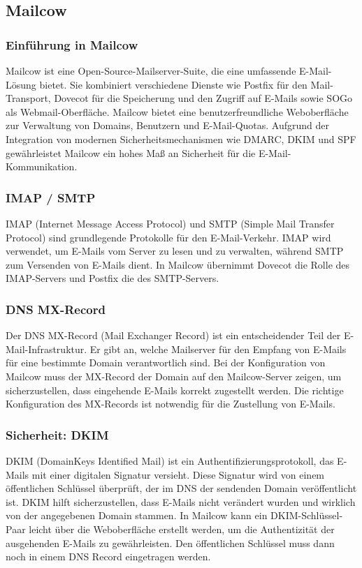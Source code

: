 \subsection{Mailcow}

\subsubsection{Einführung in Mailcow}
Mailcow ist eine Open-Source-Mailserver-Suite, die eine umfassende E-Mail-Lösung bietet. Sie kombiniert 
verschiedene Dienste wie Postfix für den Mail-Transport, Dovecot für die Speicherung und den Zugriff auf 
E-Mails sowie SOGo als Webmail-Oberfläche. Mailcow bietet eine benutzerfreundliche Weboberfläche zur 
Verwaltung von Domains, Benutzern und E-Mail-Quotas. Aufgrund der Integration von modernen Sicherheitsmechanismen 
wie DMARC, DKIM und SPF gewährleistet Mailcow ein hohes Maß an Sicherheit für die E-Mail-Kommunikation.

\subsubsection{IMAP / SMTP}
IMAP (Internet Message Access Protocol) und SMTP (Simple Mail Transfer Protocol) sind grundlegende Protokolle 
für den E-Mail-Verkehr. IMAP wird verwendet, um E-Mails vom Server zu lesen und zu verwalten, während SMTP zum 
Versenden von E-Mails dient. In Mailcow übernimmt Dovecot die Rolle des IMAP-Servers und Postfix die des 
SMTP-Servers. 

\subsubsection{DNS MX-Record}
Der DNS MX-Record (Mail Exchanger Record) ist ein entscheidender Teil der E-Mail-Infrastruktur. Er gibt an, 
welche Mailserver für den Empfang von E-Mails für eine bestimmte Domain verantwortlich sind. Bei der Konfiguration 
von Mailcow muss der MX-Record der Domain auf den Mailcow-Server zeigen, um sicherzustellen, dass eingehende 
E-Mails korrekt zugestellt werden. Die richtige Konfiguration des MX-Records ist notwendig für die Zustellung 
von E-Mails.

\subsubsection{Sicherheit: DKIM}
DKIM (DomainKeys Identified Mail) ist ein Authentifizierungsprotokoll, das E-Mails mit einer digitalen 
Signatur versieht. Diese Signatur wird von einem öffentlichen Schlüssel überprüft, der im DNS der sendenden
Domain veröffentlicht ist. DKIM hilft sicherzustellen, dass E-Mails nicht verändert wurden und wirklich von
der angegebenen Domain stammen. In Mailcow kann ein DKIM-Schlüssel-Paar leicht über die Weboberfläche erstellt
werden, um die Authentizität der ausgehenden E-Mails zu gewährleisten. Den öffentlichen Schlüssel muss dann noch 
in einem DNS Record eingetragen werden.

